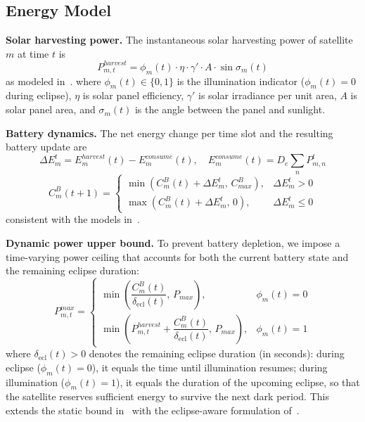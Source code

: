 \documentclass[journal]{IEEEtran}
\newcommand{\CB}{C^{B}}
\newcommand{\CBmax}{C^{B}_{max}}
\newcommand{\Pmax}{P_{max}}
\newcommand{\Pharvest}{P^{harvest}}
\begin{document}
\subsection{Energy Model}

\textbf{Solar harvesting power.}
The instantaneous solar harvesting power of satellite $m$ at time $t$ is
\begin{equation}
    \Pharvest_{m,t} = \phi_m(t)\cdot\eta\cdot
    \gamma'\cdot A\cdot\sin\sigma_m(t)
    \label{eq:harvest}
\end{equation}
as modeled in~\cite{li2023energy,li2023deepisl}.
where $\phi_m(t)\in\{0,1\}$ is the illumination indicator ($\phi_m(t)=0$ during eclipse), $\eta$ is solar panel efficiency, $\gamma'$ is solar irradiance per unit area, $A$ is solar panel area, and $\sigma_m(t)$ is the angle between the panel and sunlight.

\textbf{Battery dynamics.}
The net energy change per time slot and the resulting battery update are
\begin{equation}
    \Delta E_m^t = E_m^{harvest}(t) -
    E_m^{consume}(t), \quad
    E_m^{consume}(t)= D_e\sum_{n}P_{m,n}^{t}
    \label{eq:deltaE}
\end{equation}
\begin{equation}
    \CB_m(t{+}1) = \begin{cases}
        \min\!\left(\CB_m(t)+\Delta E_m^t,\,
        \CBmax\right),
        & \Delta E_m^t > 0 \\
        \max\!\left(\CB_m(t)+\Delta E_m^t,\,0
        \right),
        & \Delta E_m^t \leq 0
    \end{cases}
    \label{eq:battery}
\end{equation}
consistent with the models in~\cite{li2023energy,li2023deepisl}.

\textbf{Dynamic power upper bound.}
To prevent battery depletion, we impose a time-varying power ceiling that accounts for both the current battery state and the remaining eclipse duration:
\begin{equation}
    P_{m,t}^{max} = \begin{cases}
        \min\!\left(\dfrac{\CB_m(t)}{\delta_{\mathrm{ecl}}(t)},\,
        \Pmax\right),
        & \phi_m(t)=0\\[6pt]
        \min\!\left(\Pharvest_{m,t}+
        \dfrac{\CB_m(t)}{\delta_{\mathrm{ecl}}(t)},\,\Pmax\right),
        & \phi_m(t)=1
    \end{cases}
    \label{eq:dynpower}
\end{equation}
where $\delta_{\mathrm{ecl}}(t)>0$ denotes the remaining eclipse duration (in seconds): during eclipse ($\phi_m(t)=0$), it equals the time until illumination resumes; during illumination ($\phi_m(t)=1$), it equals the duration of the upcoming eclipse, so that the satellite reserves sufficient energy to survive the next dark period.
This extends the static bound in~\cite{cen2024satflow} with the eclipse-aware formulation of~\cite{li2023deepisl}.
\end{document}
